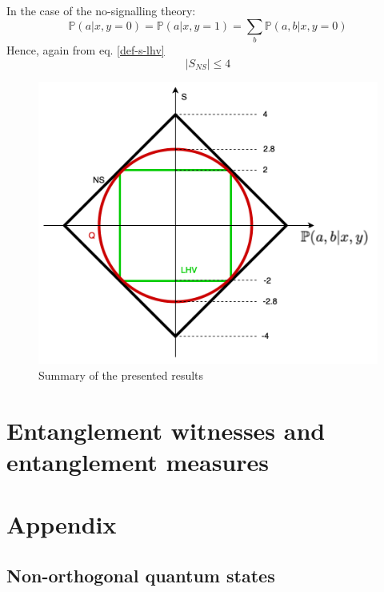 \documentclass{article}
\begin{document}
In the case of the no-signalling theory:
\begin{equation}
    \mathbb{P}(a|x,y=0) = \mathbb{P}(a|x, y=1) = \sum_b \mathbb{P}(a,b|x,y=0)
\end{equation}
Hence, again from eq. \ref{def-s-lhv}
\begin{equation}
    |S_{NS}| \leq 4
\end{equation}

\begin{figure}[h]
    \centering
    \includegraphics[scale=0.25]{s-recap.png}
    \caption{Summary of the presented results}
\end{figure}
\newpage
\section{Entanglement witnesses and entanglement measures}


\newpage
\section{Appendix}
\subsection{Non-orthogonal quantum states}
\end{document}
